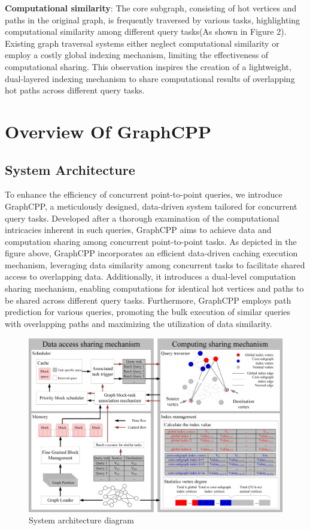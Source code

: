 \documentclass[lettersize,journal]{IEEEtran} %
\begin{document}
{\bf{Computational similarity}}: The core subgraph, consisting of hot vertices and paths in the original graph, is frequently traversed by various tasks, highlighting computational similarity among different query tasks(As shown in Figure 2). Existing graph traversal systems either neglect computational similarity\cite{pnp} or employ a costly global indexing mechanism\cite{sgraph}\cite{tripoline}, limiting the effectiveness of computational sharing. This observation inspires the creation of a lightweight, dual-layered indexing mechanism to share computational results of overlapping hot paths across different query tasks. 

\section{Overview Of GraphCPP}

\subsection{System Architecture}
To enhance the efficiency of concurrent point-to-point queries, we introduce GraphCPP, a meticulously designed, data-driven system tailored for concurrent query tasks. Developed after a thorough examination of the computational intricacies inherent in such queries, GraphCPP aims to achieve data and computation sharing among concurrent point-to-point tasks. As depicted in the figure above, GraphCPP incorporates an efficient data-driven caching execution mechanism, leveraging data similarity among concurrent tasks to facilitate shared access to overlapping data. Additionally, it introduces a dual-level computation sharing mechanism, enabling computations for identical hot vertices and paths to be shared across different query tasks. Furthermore, GraphCPP employs path prediction for various queries, promoting the bulk execution of similar queries with overlapping paths and maximizing the utilization of data similarity. 

\begin{figure}[!t]
    \centering
    \includegraphics[width=\columnwidth]{系统架构.png}
    \captionsetup{labelsep=period}
    \caption{System architecture diagram}
    \label{fig7}
  \end{figure}
  
\end{document}
